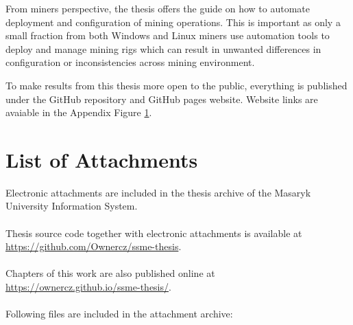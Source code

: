 \documentclass[
  printed, %
  table,   %
  lof,     %
  lot,     %
           oneside, color
]{fithesis3}
\renewcommand{\texttt}[1]{%
  \begingroup
  \ttfamily
  \begingroup\lccode`~=`/\lowercase{\endgroup\def~}{/\discretionary{}{}{}}%
  \begingroup\lccode`~=`[\lowercase{\endgroup\def~}{[\discretionary{}{}{}}%
  \begingroup\lccode`~=`.\lowercase{\endgroup\def~}{.\discretionary{}{}{}}%
  \catcode`/=\active\catcode`[=\active\catcode`.=\active
  \scantokens{#1\noexpand}%
  \endgroup
}
\begin{document}
From miners perspective, the thesis offers the guide on how to automate deployment and configuration of mining operations. This is important as only a small fraction from both Windows and Linux miners use automation tools to deploy and manage mining rigs which can result in unwanted differences in configuration or inconsistencies across mining environment.

To make results from this thesis more open to the public, everything is published under the GitHub repository and GitHub pages website. Website links are avaiable in the Appendix Figure \ref{cha:listofattachments}.

\fi

\setlength{\emergencystretch}{3em}
\printbibliography[heading=bibintoc]
\let\cleardoublepage\clearpage
\begingroup
\let\cleardoublepage\clearpage
\appendix
\chapter{List of Attachments}
\label{cha:listofattachments}
Electronic attachments are included in the thesis archive of the Masaryk University Information System. 
\\
\\
Thesis source code together with electronic attachments is available at \url{https://github.com/Ownercz/ssme-thesis}. 
\\
\\
Chapters of this work are also published online at \url{https://ownercz.github.io/ssme-thesis/}. 
\\
\\
Following files are included in the attachment archive:
\end{document}
